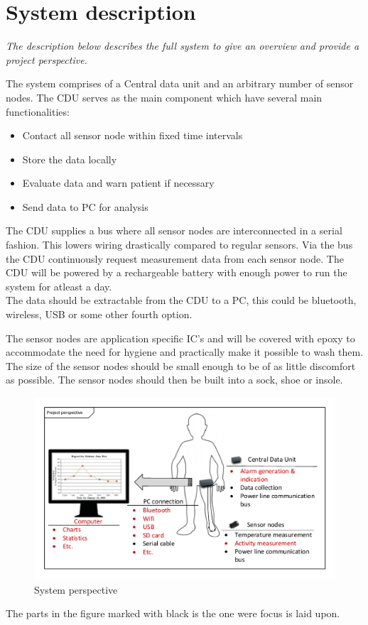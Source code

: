 \chapter{System description}
\textit{The description below describes the full system to give an overview and provide a project perspective.}

The system comprises of a Central data unit and an arbitrary number of sensor nodes. The CDU serves as the main component which have several main functionalities:
\begin{itemize}
	\item Contact all sensor node within fixed time intervals
	\item Store the data locally
	\item Evaluate data and warn patient if necessary
	\item Send data to PC for analysis
\end{itemize}
The CDU supplies a bus where all sensor nodes are interconnected in a serial fashion. This lowers wiring drastically compared to regular sensors.
Via the bus the CDU continuously request measurement data from each sensor node. The CDU will be powered by a rechargeable battery with enough power to run the system for atleast a day.\\
The data should be extractable from the CDU to a PC, this could be bluetooth, wireless, USB or some other fourth option.

The sensor nodes are application specific IC's and will be covered with epoxy to accommodate the need for hygiene and practically make it possible to wash them. The size of the sensor nodes should be small enough to be of as little discomfort as possible. The sensor nodes should then be built into a sock, shoe or insole.
\begin{figure}[H]
	\centering
	\includegraphics[width=.7\textwidth]{billeder/6Systemdescription/fullsystem_vector}
	\caption{System perspective}
	\label{fig:full_system}
\end{figure}
The parts in the figure marked with black is the one were focus is laid upon.